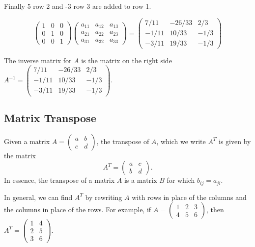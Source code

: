 \documentclass[
]{book}
\theoremstyle{definition}
\theoremstyle{definition}
\theoremstyle{definition}
\theoremstyle{definition}
\theoremstyle{remark}
\begin{document}
Finally 5 row 2 and -3 row 3 are added to row 1.

\[ \begin{pmatrix}1 & 0 & 0\\ 0 & 1 & 0\\ 0 & 0 & 1 \end{pmatrix}\begin{pmatrix} a_{11} & a_{12} & a_{13}\\  a_{21} & a_{22} & a_{23}\\  a_{31} & a_{32} & a_{33}\end{pmatrix} = \begin{pmatrix}7/11 & -26/33 & 2/3\\ -1/11 & 10/33 & -1/3\\ -3/11 & 19/33 & -1/3 \end{pmatrix}\]

The inverse matrix for \(A\) is the matrix on the right side \(A^{-1} = \begin{pmatrix}7/11 & -26/33 & 2/3\\ -1/11 & 10/33 & -1/3\\ -3/11 & 19/33 & -1/3 \end{pmatrix}\).

\hypertarget{matrix-transpose}{%
\subsection{Matrix Transpose}\label{matrix-transpose}}

Given a matrix \(A = \begin{pmatrix} a & b \\ c & d \end{pmatrix}\), the transpose of \(A\), which we write \(A^T\) is given by the matrix \[A^T = \begin{pmatrix} a & c \\ b & d \end{pmatrix}.\] In essence, the transpose of a matrix \(A\) is a matrix \(B\) for which \(b_{ij} = a_{ji}\).

In general, we can find \(A^T\) by rewriting \(A\) with rows in place of the columns and the columns in place of the rows. For example, if \(A = \begin{pmatrix} 1 & 2 & 3\\4 & 5 & 6 \end{pmatrix}\), then \(A^T = \begin{pmatrix} 1 & 4 \\ 2 & 5 \\ 3 & 6 \end{pmatrix}\).
\end{document}
